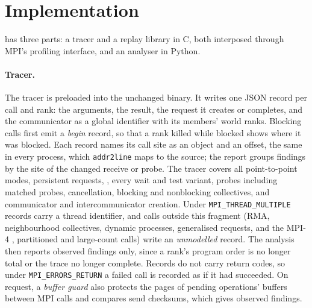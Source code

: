 \section{Implementation}
\label{sec:implementation}

\tool has three parts: a tracer and a replay library in C, both interposed through MPI's
profiling interface, and an analyser in Python.

\paragraph{Tracer.} The tracer is preloaded into the unchanged binary. It writes one JSON
record per call and rank: the arguments, the result, the request it creates or completes,
and the communicator as a global identifier with its members' world ranks. Blocking calls
first emit a \emph{begin} record, so that a rank killed while blocked shows where it was
blocked. Each record names its call site as an object and an offset,
the same in every process, which \texttt{addr2line} maps to the source; the report groups
findings by the site of the changed receive or probe. The tracer covers all point-to-point
modes, persistent requests, , every wait and test variant, probes
including matched probes, cancellation, blocking and nonblocking collectives, and
communicator and intercommunicator creation. Under \texttt{MPI\_THREAD\_MULTIPLE} records
carry a thread identifier, and calls outside this fragment (RMA, neighbourhood collectives,
dynamic processes, generalised requests, and the MPI-4 , partitioned and
large-count calls) write an \emph{unmodelled} record. The analysis then reports observed
findings only, since a rank's program order is no longer total or the trace no longer
complete. Records do not carry return codes, so under
\texttt{MPI\_ERRORS\_RETURN} a failed call is recorded as if it had succeeded. On request, a
\emph{buffer guard} also protects the pages of pending operations' buffers between MPI calls
and compares send checksums, which gives observed  findings.


